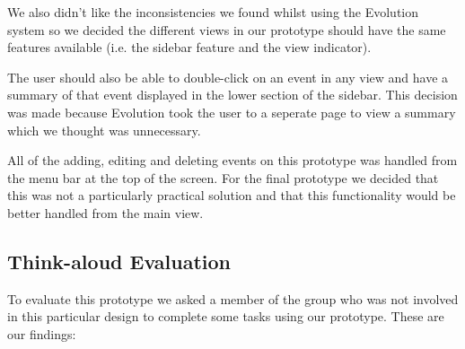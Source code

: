 \documentclass{article}
\begin{document}
We also didn't like the inconsistencies we found whilst using the
Evolution system so we decided the different views in our prototype
should have the same features available (i.e. the sidebar feature and
the view indicator).

The user should also be able to double-click on an event in any view and
have a summary of that event displayed in the lower section of the
sidebar. This decision was made because Evolution took the user to a
seperate page to view a summary which we thought was unnecessary.

All of the adding, editing and deleting events on this prototype was 
handled from the menu bar at the top of the screen. For the final
prototype we decided that this was not a particularly practical solution
and that this functionality would be better handled from the main view.

\subsection{Think-aloud Evaluation}
To evaluate this prototype we asked a member of the group who was not
involved in this particular design to complete some tasks using our
prototype. These are our findings:
\end{document}
